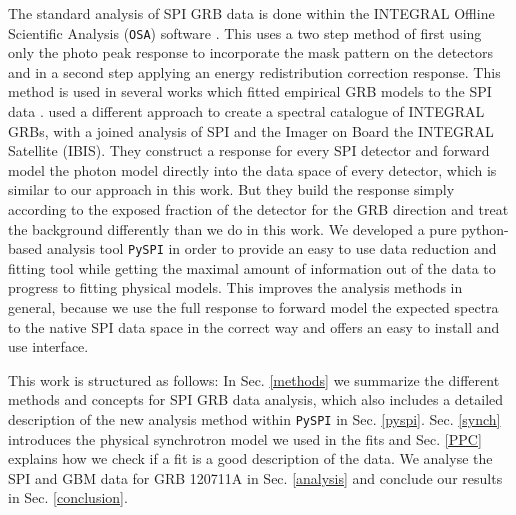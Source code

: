 \documentclass[twocolumn,traditabstract]{aa}
\begin{document}
The standard analysis of SPI GRB data is done within the INTEGRAL Offline Scientific Analysis ({\tt OSA}) software \citep{osa}. This uses a two step method of first using only the photo peak response to incorporate the mask pattern on the detectors and in a second step applying an energy redistribution correction response. This method is used in several works which fitted empirical GRB models to the SPI data \citep[e.g.][]{spi_grb1,Grebenev-2007}. \citet{spi_grb2} used a different approach to create a spectral catalogue of INTEGRAL GRBs, with a joined analysis of SPI and the Imager on Board the INTEGRAL Satellite (IBIS). They construct a response for every SPI detector and forward model the photon model directly into the data space of every detector, which is similar to our approach in this work. But they build the response simply according to the exposed fraction of the detector for the GRB direction and treat the background differently than we do in this work.
We developed a pure python-based analysis tool {\tt PySPI} in order to provide an easy to use data reduction and fitting tool while getting the maximal amount of information out of the data to progress to fitting physical models. This improves the analysis methods in general, because we use the full response to forward model the expected spectra to the native SPI data space in the correct way and offers an easy to install and use interface.

This work is structured as follows: In Sec. \ref{methods} we summarize the different methods and concepts for SPI GRB data analysis, which also includes a detailed description of the new analysis method within {\tt PySPI} in Sec. \ref{pyspi}. Sec. \ref{synch} introduces the physical synchrotron model we used in the fits and Sec. \ref{PPC} explains how we check if a fit is a good description of the data. We analyse the SPI and GBM data for GRB 120711A in Sec. \ref{analysis} and conclude our results in Sec. \ref{conclusion}.
\end{document}

